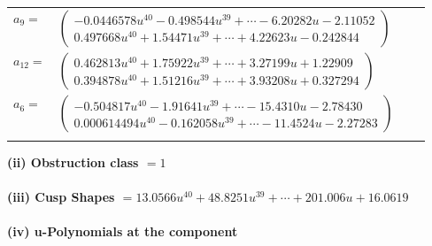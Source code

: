 \documentclass[1p]{elsarticle_modified}
\theoremstyle{definition}
\begin{document}
\begin{tabular}{m{7pt} m{180pt} m{7pt} m{180pt} }
\flushright $a_{9}=$&$\begin{pmatrix}-0.0446578 u^{40}-0.498544 u^{39}+\cdots-6.20282 u-2.11052\\0.497668 u^{40}+1.54471 u^{39}+\cdots+4.22623 u-0.242844\end{pmatrix}$ \\
\flushright $a_{12}=$&$\begin{pmatrix}0.462813 u^{40}+1.75922 u^{39}+\cdots+3.27199 u+1.22909\\0.394878 u^{40}+1.51216 u^{39}+\cdots+3.93208 u+0.327294\end{pmatrix}$ \\
\flushright $a_{6}=$&$\begin{pmatrix}-0.504817 u^{40}-1.91641 u^{39}+\cdots-15.4310 u-2.78430\\0.000614494 u^{40}-0.162058 u^{39}+\cdots-11.4524 u-2.27283\end{pmatrix}$\\&\end{tabular}
\flushleft \textbf{(ii) Obstruction class $= 1$}\\~\\
\flushleft \textbf{(iii) Cusp Shapes $= 13.0566 u^{40}+48.8251 u^{39}+\cdots+201.006 u+16.0619$}\\~\\
\newpage\renewcommand{\arraystretch}{1}
\flushleft \textbf{(iv) u-Polynomials at the component}\newline \\
\end{document}
